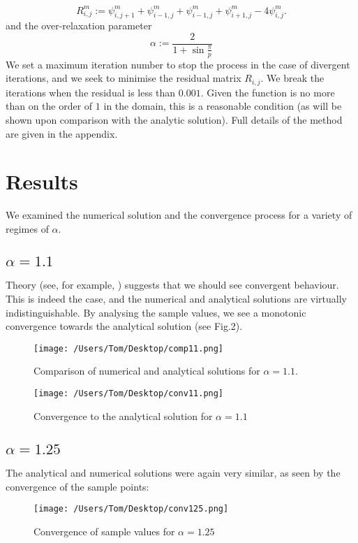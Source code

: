 \documentclass[a4paper,11pt]{article}
\begin{document}
\begin{equation}
R_{i,j}^m := \psi_{i,j+1}^m + \psi_{i-1,j}^m + \psi_{i-1,j}^m + \psi_{i+1,j}^m - 4\psi_{i,j}^m.
\end{equation}
and the over-relaxation parameter
\begin{equation}
\alpha := \frac{2}{1+\sin\frac{\pi}{p}}
\end{equation}
We set a maximum iteration number to stop the process in the case of divergent iterations, and we seek to minimise the residual matrix $R_{i,j}$. We break the iterations when the residual is less than $0.001$. Given the function is no more than on the order of $1$ in the domain, this is a reasonable condition (as will be shown upon comparison with the analytic solution). Full details of the method are given in the appendix. 
\section{Results}
We examined the numerical solution and the convergence process for a variety of regimes of $\alpha$. 
\subsection{$\alpha = 1.1$}
Theory (see, for example, \cite{theory}) suggests that we should see %
convergent behaviour. This is indeed the case, and the numerical and analytical solutions are virtually indistinguishable. By analysing the sample values, we see a monotonic convergence towards the analytical solution (see Fig.2).
\begin{figure}[h]
  \texttt{[image: /Users/Tom/Desktop/comp11.png]}
  \caption{Comparison of numerical and analytical solutions for $\alpha = 1.1$.}
  \label{fig:graph1}
\end{figure}
\begin{figure}[h!]
  \texttt{[image: /Users/Tom/Desktop/conv11.png]}
  \caption{Convergence to the analytical solution for $\alpha = 1.1$}
  \label{fig:graph1}
\end{figure}
\pagebreak
\subsection{$\alpha = 1.25$}
The analytical and numerical solutions were again very similar, as seen by the convergence of the sample points:
\begin{figure}[h!]
  \texttt{[image: /Users/Tom/Desktop/conv125.png]}
  \caption{Convergence of sample values for $\alpha = 1.25$}
  \label{fig:graph1}
  \end{figure}
  \pagebreak
\end{document}
